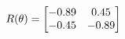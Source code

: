 \documentclass[preview]{standalone}
\begin{document}
\begin{align*}
\special{dvisvgm:raw <g id='unique000'>}R(\theta) = \begin{bmatrix}-0.89 & 0.45\\-0.45 & -0.89\end{bmatrix}\special{dvisvgm:raw </g>}
\end{align*}
\end{document}
